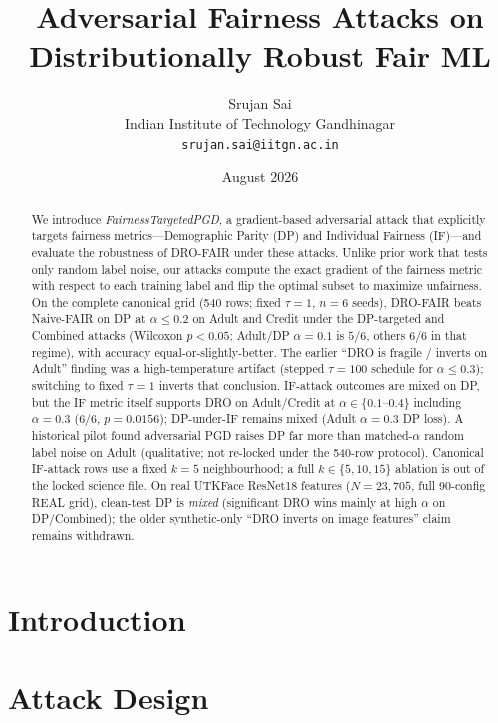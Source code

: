\documentclass[10pt,a4paper]{article}
\title{Adversarial Fairness Attacks on Distributionally Robust Fair ML}
\author{Srujan Sai \\ Indian Institute of Technology Gandhinagar \\ \texttt{srujan.sai@iitgn.ac.in}}
\date{August 2026}
\begin{document}
\maketitle

\begin{abstract}
We introduce \textit{FairnessTargetedPGD}, a gradient-based adversarial attack that explicitly targets fairness metrics---Demographic Parity (DP) and Individual Fairness (IF)---and evaluate the robustness of DRO-FAIR under these attacks. Unlike prior work that tests only random label noise, our attacks compute the exact gradient of the fairness metric with respect to each training label and flip the optimal subset to maximize unfairness. On the complete canonical grid (540 rows; fixed $\tau{=}1$, $n{=}6$ seeds), DRO-FAIR beats Naive-FAIR on DP at $\alpha\le0.2$ on Adult and Credit under the DP-targeted and Combined attacks (Wilcoxon $p{<}0.05$; Adult/DP $\alpha{=}0.1$ is $5/6$, others $6/6$ in that regime), with accuracy equal-or-slightly-better. The earlier ``DRO is fragile / inverts on Adult'' finding was a high-temperature artifact (stepped $\tau{=}100$ schedule for $\alpha\le 0.3$); switching to fixed $\tau{=}1$ inverts that conclusion. IF-attack outcomes are mixed on DP, but the IF metric itself supports DRO on Adult/Credit at $\alpha\in\{0.1$--$0.4\}$ including $\alpha{=}0.3$ ($6/6$, $p{=}0.0156$); DP-under-IF remains mixed (Adult $\alpha{=}0.3$ DP loss). A historical pilot found adversarial PGD raises DP far more than matched-$\alpha$ random label noise on Adult (qualitative; not re-locked under the 540-row protocol). Canonical IF-attack rows use a fixed $k{=}5$ neighbourhood; a full $k\in\{5,10,15\}$ ablation is out of the locked science file. On real UTKFace ResNet18 features ($N{=}23{,}705$, full 90-config REAL grid), clean-test DP is \emph{mixed} (significant DRO wins mainly at high $\alpha$ on DP/Combined); the older synthetic-only ``DRO inverts on image features'' claim remains withdrawn.
\end{abstract}

\section{Introduction}
\label{sec:intro}


\section{Attack Design}
\label{sec:attack}

\end{document}
